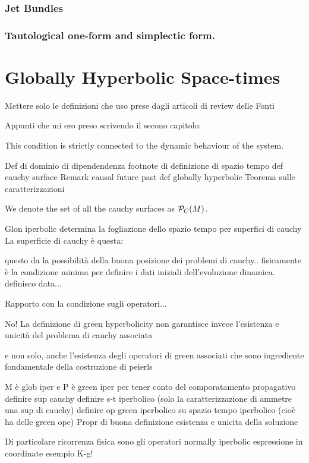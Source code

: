 \documentclass[Main]{subfiles}
\begin{document}
			\subsubsection{Jet Bundles}
			\subsubsection{Tautological one-form and simplectic form.}
	
	\section{Globally Hyperbolic Space-times}
			\begin{Warning}
				Mettere solo le definizioni che uso prese dagli articoli di review delle Fonti
			\end{Warning}	
			Appunti che mi ero preso scrivendo il secono capitolo:
					
			This condition is strictly connected to the dynamic behaviour of the system.
			
			\begin{Warning}
			Def di dominio di dipendendenza
			footnote di definizione di spazio tempo
			def cauchy surface
			Remark causal future past
			def globally hyperbolic
			Teorema sulle caratterizzazioni
			\end{Warning}			
			
			\begin{notationfix}
				We denote the set of all the cauchy surfaces as $\mathcal{P}_{C}(M)$.
			\end{notationfix}
					

		Glon iperbolic determina la fogliazione dello spazio tempo per superfici di cauchy
		La superficie di cauchy è questa:
		\begin{definition}
		\end{definition}		
		questo da la possibilità della buona posizione dei problemi di cauchy.. fisicamente è la condizione minima per definire i dati iniziali dell'evoluzione dinamica.
		definisco data...
						
		\begin{Warning}
		Rapporto con la condizione sugli operatori...		
		
				
	No!		La definizione di green hyperbolicity non garantisce invece l'esistenza e unicità del problema di cauchy associata
		
		e non solo, anche l'esistenza degli operatori di green associati che sono ingrediente fondamentale della costruzione di peierls

		M è glob iper e P è green iper per tener conto del comporatamento propagativo
		definire sup cauchy
		definire s-t iperbolico (solo la caratterizzazione di ammetre una sup di cauchy)
		definire op green iperbolico su spazio tempo iperbolico (cioè ha delle green ope)
		Propr di buona definizione esistenza e unicita della soluzione
		
		Di particolare ricorrenza fisica sono gli operatori normally iperbolic
		espressione in coordinate
		esempio K-g!
		\end{Warning}						
						
\end{document}
